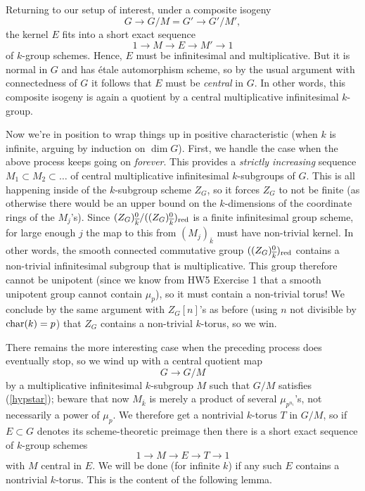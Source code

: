 \documentclass[10pt]{article}
\renewcommand{\(}{\left(}
\renewcommand{\)}{\right)}
\numberwithin{thm}{subsection}
\begin{document}
Returning to our setup of interest, under a composite isogeny
$$G \rightarrow G/M = G' \rightarrow G'/M',$$
the kernel $E$ fits into a short exact sequence
$$1 \rightarrow M \rightarrow E \rightarrow M' \rightarrow 1$$
of $k$-group schemes.  Hence, $E$ must be infinitesimal and multiplicative.
But it is normal in $G$ and has \'etale automorphism scheme, so by
the usual argument with connectedness of $G$ it follows that $E$ must be {\em central} in $G$.
In other words, this composite isogeny is again a quotient by a central multiplicative
infinitesimal $k$-group.  

Now we're in position to wrap things up in positive characteristic (when $k$ is infinite,
arguing by induction on $\dim G$).   First, we handle the
case when the above process keeps going on {\em forever}. 
This provides a {\em strictly increasing} sequence $M_1 \subset M_2 \subset \dots$
of central multiplicative infinitesimal $k$-subgroups of $G$. 
This is all happening inside of the $k$-subgroup scheme $Z_G$, so
it forces $Z_G$ to not be finite (as otherwise there would be an upper
bound on the $k$-dimensions of the coordinate rings of the $M_j$'s). 
Since $(Z_G)^0_{\overline{k}}/((Z_G)^0_{\overline{k}})_{\rm{red}}$
is a finite infinitesimal group scheme,  for large enough $j$ the map
to this from $(M_j)_{\overline{k}}$ must have non-trivial kernel.
In other words, the smooth connected commutative group
$((Z_G)^0_{\overline{k}})_{\rm{red}}$ contains a non-trivial
infinitesimal subgroup that is multiplicative.  This
group therefore cannot be unipotent (since we know from HW5 Exercise 1 
that a smooth unipotent group cannot contain $\mu_p$),
so it must contain a non-trivial torus!   We conclude
by the same argument with $Z_G[n]$'s as before (using
$n$ not divisible by ${\rm{char}}(k) = p$) that $Z_G$ contains
a non-trivial $k$-torus, so we win. 

There remains the more interesting case when the preceding process does eventually stop,
so we wind up with a central quotient map
$$G \rightarrow G/M$$
by a multiplicative infinitesimal $k$-subgroup $M$
such that $G/M$ satisfies (\ref{hypstar}); beware
that now $M_{\overline{k}}$ is merely a product of several $\mu_{p^{n_i}}$'s, not
necessarily a power of $\mu_p$.   We therefore
get a nontrivial $k$-torus $T$ in $G/M$, so if
$E \subset G$ denotes its scheme-theoretic preimage then there is a short exact sequence
of $k$-group schemes
$$1 \rightarrow M \rightarrow E \rightarrow T \rightarrow 1$$
with $M$ central in $E$.  We will be done (for infinite $k$) if
any such $E$ contains a nontrivial $k$-torus.   This is the content of the following lemma.
\end{document}
